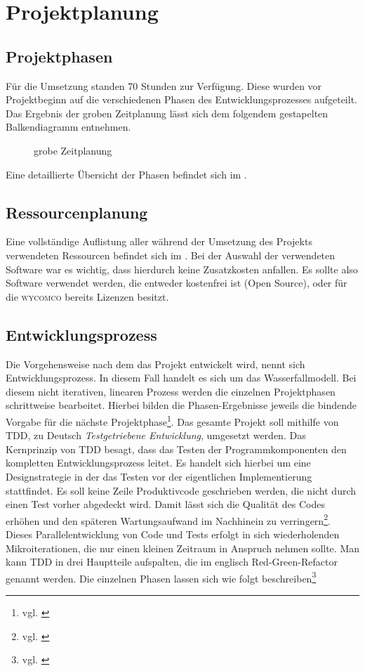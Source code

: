 \section{Projektplanung} 
\label{sec:Projektplanung}
\subsection{Projektphasen}
\label{sec:Projektphasen}
Für die Umsetzung standen 70 Stunden zur Verfügung. Diese wurden vor Projektbeginn auf die verschiedenen Phasen des Entwicklungsprozesses aufgeteilt. 
Das Ergebnis der groben Zeitplanung lässt sich dem folgendem gestapelten Balkendiagramm entnehmen. 
\begin{figure}[htb]
\centering
{}
\caption{grobe Zeitplanung}
\end{figure}
Eine detaillierte Übersicht der Phasen befindet sich im .
\subsection{Ressourcenplanung}
\label{sec:Ressourcenplanung}

Eine vollständige Auflistung aller während der Umsetzung des Projekts verwendeten Ressourcen befindet sich im . Bei der Auswahl der verwendeten Software war es wichtig, dass hierdurch keine Zusatzkosten anfallen. Es sollte also Software verwendet werden, die entweder kostenfrei ist (\zB Open Source), oder für die \textsc{wycomco} bereits Lizenzen besitzt.
\subsection{Entwicklungsprozess}
\label{sec:Entwicklungsprozess}
Die Vorgehensweise nach dem das Projekt entwickelt wird, nennt sich Entwicklungsprozess. In diesem Fall handelt es sich um das Wasserfallmodell.
Bei diesem nicht iterativen, linearen Prozess werden die einzelnen Projektphasen schrittweise bearbeitet. Hierbei bilden die Phasen-Ergebnisse jeweils die bindende Vorgabe für die nächste
Projektphase\footnote{vgl. \cite[S. 263]{ItHandbuch}}.
Das gesamte Projekt soll mithilfe von \ac{TDD}, zu Deutsch \textit{Testgetriebene Entwicklung}, umgesetzt werden. Das Kernprinzip von \acs{TDD} besagt, dass das Testen der Programmkomponenten den kompletten Entwicklungsprozess leitet.
Es handelt sich hierbei um eine Designstrategie in der das Testen vor der eigentlichen Implementierung stattfindet. Es soll keine Zeile Produktivcode geschrieben werden, die nicht durch einen Test vorher abgedeckt wird.
Damit lässt sich die Qualität des Codes erhöhen und den späteren Wartungsaufwand im Nachhinein zu verringern\footnote{vgl. \cite{datenschutzbeauftragter}}.
Dieses Parallelentwicklung von Code und Tests erfolgt in sich wiederholenden Mikroiterationen, die nur einen kleinen Zeitraum in Anspruch nehmen sollte. Man kann \acs{TDD} in drei Hauptteile aufspalten, die im englisch Red-Green-Refactor genannt werden. Die einzelnen Phasen lassen sich wie folgt beschreiben\footnote{vgl. \cite{tddwiki}}
